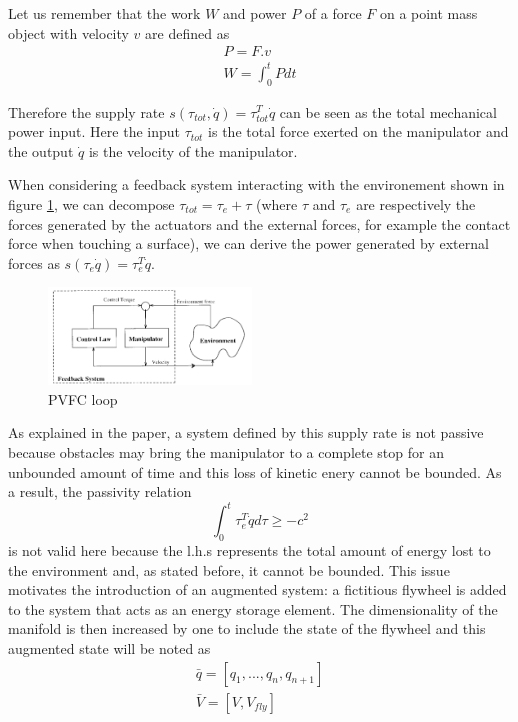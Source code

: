 Let us remember that the work $W$ and power $P$ of a force $F$ on a point mass object with velocity $v$ are defined as
\begin{align}
    P = F.v\\
    W = \int_{0}^{t}P dt
\end{align}

Therefore the supply rate  $s(\tau_{tot},\dot{q})=\tau_{tot}^{T}\dot{q}$ can be seen as the total mechanical power input. Here the input $\tau_{tot}$ is the total force exerted on the manipulator 
and the output $\dot{q}$ is the velocity of the manipulator. 

When considering a feedback system interacting with the environement shown in figure \ref{fig:pvfccontrolloop}, we can decompose $\tau_{tot}=\tau_{e}+\tau$ (where $\tau$ and $\tau_{e}$ are respectively the forces generated by the actuators and the external forces, for example the contact force when touching a surface),
we can derive the power generated by external forces as $s(\tau_{e}\dot{q})=\tau_{e}^T \dot{q}$. 
\begin{figure}[h!]
    \centering
    \includegraphics[width=0.48\textwidth]{Images/pvfccontrolloop.png}
    \caption{PVFC loop \cite{li1999passive}}
    \label{fig:pvfccontrolloop}
\end{figure} 
As explained in the paper, a system defined by this supply rate is not passive because obstacles may bring the manipulator to a complete stop for an unbounded amount of time and this loss of kinetic enery cannot be bounded. 
As a result, the passivity relation 
\begin{equation}
    \int_{0}^{t}\tau_{e}^T \dot{q}d\tau \geq -c^2 
\end{equation}
is not valid here because the l.h.s represents the total amount of energy lost to the environment and, as stated before, it cannot be bounded. 
This issue motivates the introduction of an augmented system: a fictitious flywheel is added to the system that acts as an energy storage element.
The dimensionality of the manifold is then increased by one to include the state of the flywheel and this augmented state will be noted as
\begin{align} 
    \bar{q}=[q_1,...,q_n,q_{n+1}]\\
    \bar{V} = [V, V_{fly}]
\end{align}


